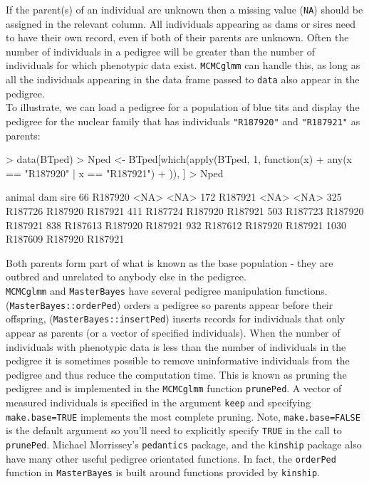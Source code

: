 \documentclass{article}
\begin{document}
If the parent(s) of an individual are unknown then a missing value (\texttt{NA}) should be assigned in the relevant column. All individuals appearing as dams or sires need to have their own record, even if both of their parents are unknown. Often the number of individuals in a pedigree will be greater than the number of individuals for which phenotypic data exist. \texttt{MCMCglmm} can handle this, as long as all the individuals appearing in the data frame passed to \texttt{data} also appear in the pedigree.\\
   
To illustrate, we can load a pedigree for a population of blue tits and display the pedigree for the nuclear family that has individuals \texttt{"R187920"} and \texttt{"R187921"} as parents:

\begin{Schunk}
\begin{Sinput}
> data(BTped)
> Nped <- BTped[which(apply(BTped, 1, function(x) {
+     any(x == "R187920" | x == "R187921")
+ })), ]
> Nped
\end{Sinput}
\begin{Soutput}
      animal     dam    sire
66   R187920    <NA>    <NA>
172  R187921    <NA>    <NA>
325  R187726 R187920 R187921
411  R187724 R187920 R187921
503  R187723 R187920 R187921
838  R187613 R187920 R187921
932  R187612 R187920 R187921
1030 R187609 R187920 R187921
\end{Soutput}
\end{Schunk}

Both parents form part of what is known as the base population - they are outbred and unrelated to anybody else in the pedigree.\\

\texttt{MCMCglmm} and \texttt{MasterBayes} have several pedigree manipulation functions. (\texttt{MasterBayes::orderPed})  orders a pedigree so parents appear before their offspring, (\texttt{MasterBayes::insertPed}) inserts records for individuals that only appear as parents (or a vector of specified individuals).  When the number of individuals with phenotypic data is less than the number of individuals in the pedigree it is sometimes possible to remove uninformative individuals from the pedigree and thus reduce the computation time. This is known as pruning the pedigree and is implemented in the  \texttt{MCMCglmm} function \texttt{prunePed}. A vector of measured individuals is specified in the argument \texttt{keep} and specifying \texttt{make.base=TRUE} implements the most complete pruning. Note,  \texttt{make.base=FALSE} is the default argument so you'll need to explicitly specify \texttt{TRUE} in the call to  \texttt{prunePed}. Michael Morrissey's \texttt{pedantics} package, and the \texttt{kinship} package also have many other useful pedigree orientated functions. In fact, the \texttt{orderPed} function in \texttt{MasterBayes} is built around functions provided by  \texttt{kinship}.\\
\end{document}

